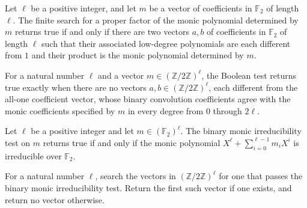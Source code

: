 \begin{theorem}
\label{FABL.binaryHasProperFactor_eq_true_iff}
\leanok
{}
Let $\ell$ be a positive integer, and let $m$ be a vector of coefficients in $\mathbb{F}_2$ of
length $\ell$. The finite search for a proper factor of the monic polynomial determined
by $m$ returns true if and only if there are two vectors $a,b$ of coefficients in $\mathbb{F}_2$
of length $\ell$ such that their associated low-degree polynomials are each different
from $1$ and their product is the monic polynomial determined by $m$.
\end{theorem}

\begin{definition}
\label{FABL.binaryMonicIrreducibleTest}
\leanok
{}
For a natural number $\ell$ and a vector $m\in(\mathbb{Z}/2\mathbb{Z})^\ell$, the
Boolean test returns true exactly when there are no vectors
$a,b\in(\mathbb{Z}/2\mathbb{Z})^\ell$, each different from the all-one coefficient
vector, whose binary convolution coefficients agree with the monic coefficients
specified by $m$ in every degree from $0$ through $2\ell$.
\end{definition}

\begin{theorem}
\label{FABL.binaryMonicIrreducibleTest_eq_true_iff}
\leanok
{}
Let $\ell$ be a positive integer and let $m\in(\mathbb{F}_2)^\ell$. The binary monic
irreducibility test on $m$ returns true if and only if the monic polynomial
$X^\ell+\sum_{i=0}^{\ell-1}m_iX^i$ is irreducible over $\mathbb{F}_2$.
\end{theorem}

\begin{definition}
\leanok
{}
For a natural number $\ell$, search the vectors in $(\mathbb{Z}/2\mathbb{Z})^\ell$ for
one that passes the binary monic irreducibility test. Return the first such vector if
one exists, and return no vector otherwise.
\end{definition}

